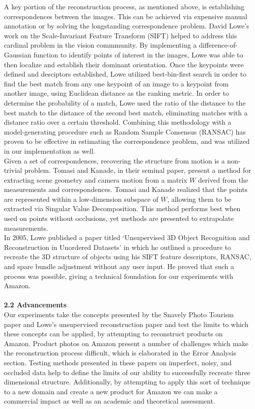\documentclass[12pt]{article}
\begin{document}
\begin{multicols}{2}
\indent A key portion of the reconstruction process, as mentioned above, is establishing correspondences between the images. This can be achieved via expensive manual annotation or by solving the longstanding correspondence problem. David Lowe's work on the Scale-Invariant Feature Transform (SIFT) helped to address this cardinal problem in the vision commmunity. By implementing a difference-of-Gaussian function to identify points of interest in the images, Lowe was able to then localize and establish their dominant orientation. Once the keypoints were defined and desciptors established, Lowe utilized best-bin-first search in order to find the best match from any one keypoint of an image to a keypoint from another image, using Euclidean distance as the ranking metric. In order to determine the probability of a match, Lowe used the ratio of the distance to the best match to the distance of the second best match, eliminating matches with a distance ratio over a certain threshold. Combining this methodology with a model-generating procedure such as Random Sample Consensus (RANSAC) has proven to be effective in estimating the correspondence problem, and was utilized in our implementation as well. \\
\indent Given a set of correspondences, recovering the structure from motion is a non-trivial problem. Tomasi and Kanade, in their seminal paper, present a method for extracting scene geometry and camera motion from a matrix $W$ derived from the measurements and correspondences. Tomasi and Kanade realized that the points are represented within a low-dimension subspace of $W$, allowing them to be extracted via Singular Value Decomposition. This method performs best when used on points without occlusions, yet methods are presented to extrapolate measurements. \\
\indent In 2005, Lowe published a paper titled `Unsupervised 3D Object Recognition and Reconstruction in Unordered Datasets' in which he outlined a procedure to recreate the 3D structure of objects using his SIFT feature descriptors, RANSAC, and spare bundle adjustment without any user input. He proved that such a process was possible, giving a technical foundation for our experiments with Amazon.\\\\
{\large \textbf{2.2 Advancements}}\\
Our experiments take the concepts presented by the Snavely Photo Tourism paper and Lowe's unsupervised reconstruction paper and test the limits to which these concepts can be applied, by attempting to reconstruct products on Amazon. Product photos on Amazon present a number of challenges which make the reconstruction process difficult, which is elaborated in the Error Analysis section. Testing methods presented in these papers on imperfect, noisy, and occluded data help to define the limits of our ability to successfully recreate three dimensional structure. Additionally, by attempting to apply this sort of technique to a new domain and create a new product for Amazon we can make a commercial impact as well as an academic and theoretical assessment. \\\\

\end{multicols}
\end{document}
